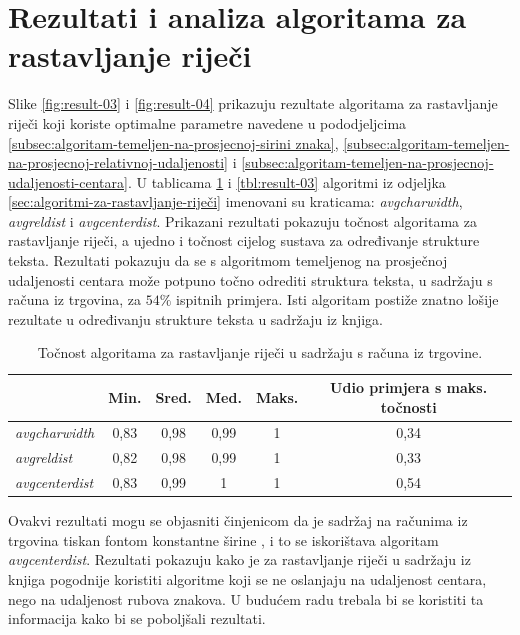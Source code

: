 \documentclass[times, utf8, zavrsni]{fer}
\begin{document}
\pagebreak







\section{Rezultati i analiza algoritama za rastavljanje riječi}
\label{sec:rezultati-i-analiza-algoritama-za-rastavljanje-rijeci}
Slike \ref{fig:result-03} i \ref{fig:result-04} prikazuju rezultate algoritama
za rastavljanje riječi koji koriste optimalne parametre navedene u
pododjeljcima \ref{subsec:algoritam-temeljen-na-prosjecnoj-sirini znaka},
\ref{subsec:algoritam-temeljen-na-prosjecnoj-relativnoj-udaljenosti} i
\ref{subsec:algoritam-temeljen-na-prosjecnoj-udaljenosti-centara}. U tablicama
\ref{tbl:result-02} i \ref{tbl:result-03} algoritmi iz odjeljka
\ref{sec:algoritmi-za-rastavljanje-riječi} imenovani su kraticama:
\emph{avgcharwidth}, \emph{avgreldist} i \emph{avgcenterdist}. Prikazani
rezultati pokazuju točnost algoritama za rastavljanje riječi, a ujedno i
točnost cijelog sustava za određivanje strukture teksta.
Rezultati pokazuju da se s algoritmom temeljenog na prosječnoj udaljenosti
centara može potpuno točno odrediti struktura teksta, u sadržaju s računa iz
trgovina, za $54\%$ ispitnih primjera. Isti algoritam postiže znatno lošije
rezultate u određivanju strukture teksta u sadržaju iz knjiga.

\begin{table}[htb]
\caption{
    Točnost algoritama za rastavljanje riječi u sadržaju s računa iz trgovine.
}
\label{tbl:result-02}
\centering
\begin{tabular}{lccccc} \hline
& Min. & Sred. & Med. & Maks. & Udio primjera s maks. točnosti \\ \hline
\emph{avgcharwidth} & 0,83 & 0,98 & 0,99 & 1 & 0,34 \\
\emph{avgreldist} & 0,82 & 0,98 & 0,99 & 1 & 0,33 \\
\emph{avgcenterdist} & 0,83 & 0,99 & 1 & 1 & 0,54 \\ \hline
\end{tabular}
\end{table}

Ovakvi rezultati
mogu se objasniti činjenicom da je sadržaj na računima iz trgovina tiskan
fontom konstantne širine , i to se iskorištava algoritam
\emph{avgcenterdist}. Rezultati pokazuju kako je za rastavljanje riječi u
sadržaju iz knjiga pogodnije koristiti algoritme koji se ne oslanjaju na
udaljenost centara, nego na udaljenost rubova znakova. U budućem radu trebala
bi se koristiti ta informacija kako bi se poboljšali rezultati.
\end{document}

